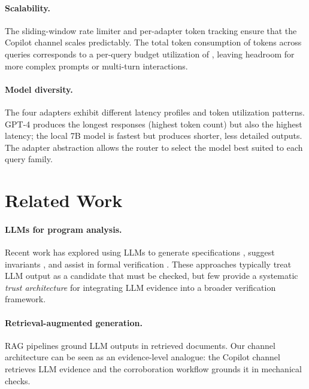 \documentclass[11pt]{article}
\begin{document}
\paragraph{Scalability.}
The sliding-window rate limiter and per-adapter token tracking
ensure that the Copilot channel scales predictably.  The total
token consumption of \ppLXXXVIIItotalTokens{} tokens across
\ppLXXXVIIIacceptedQueries{} queries corresponds to a per-query
budget utilization of \ppLXXXVIIItokenBudgetPct, leaving
headroom for more complex prompts or multi-turn interactions.

\paragraph{Model diversity.}
The four adapters exhibit different latency profiles and token
utilization patterns.  GPT-4 produces the longest responses
(highest token count) but also the highest latency; the local
7B model is fastest but produces shorter, less detailed outputs.
The adapter abstraction allows the router to select the model
best suited to each query family.

\section{Related Work}
\label{sec:related}

\paragraph{LLMs for program analysis.}
Recent work has explored using LLMs to generate specifications
\cite{endres2024can,pei2023can}, suggest invariants
\cite{chakraborty2024ranking,wu2024lemur}, and assist in
formal verification \cite{first2023baldur,yang2024leandojo}.
These approaches typically treat LLM output as a candidate
that must be checked, but few provide a systematic
\emph{trust architecture} for integrating LLM evidence into
a broader verification framework.

\paragraph{Retrieval-augmented generation.}
RAG pipelines \cite{lewis2020retrieval,gao2023retrieval}
ground LLM outputs in retrieved documents.  Our channel
architecture can be seen as an evidence-level analogue:
the Copilot channel retrieves LLM evidence and the
corroboration workflow grounds it in mechanical checks.
\end{document}
